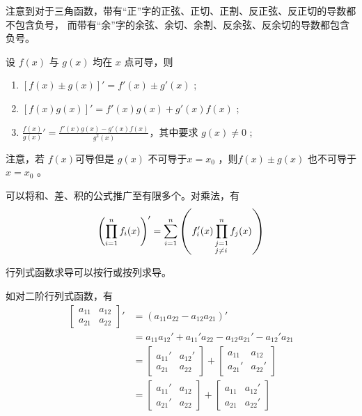 注意到对于三角函数，带有“正”字的正弦、正切、正割、反正弦、反正切的导数都不包含负号，
而带有“余”字的余弦、余切、余割、反余弦、反余切的导数都包含负号。

\begin{Field}[导数的四则运算法则]

    设 $ f(x) $ 与 $ g(x) $ 均在 $ x $ 点可导，则
    \begin{enumerate}
        \item $ \left[f(x)\pm g(x)\right]'=f'(x)\pm g'(x) $ ;
        \item $ \left[f(x)g(x)\right]'=f'(x)g(x)+g'(x)f(x) $ ;
        \item $ \frac{f(x)}{g(x)}'=\frac{f'(x)g(x)-g'(x)f(x)}{g^2(x)}$，其中要求 $ g(x)\neq 0 $  ;
    \end{enumerate}
\end{Field}

注意，若 $ f(x) $可导但是 $ g(x) $ 不可导于$ x=x_0 $ ，则$ f(x)\pm g(x) $ 也不可导于 $ x=x_0 $ 。

可以将和、差、积的公式推广至有限多个。对乘法，有
$$
    \left(\prod_{i=1}^nf_i(x)\right)'=\sum_{i=1}^n\left(f'_i(x)\prod_{\begin{subarray}{align}j=1\\j\neq i\end{subarray}}^n f_j(x)\right)
$$ 

\begin{Field}[行列式函数求导]

    行列式函数求导可以按行或按列求导。
    
    如对二阶行列式函数，有
    \begin{equation*}
        \begin{aligned}
            \left[\begin{matrix}
                a_{11}&a_{12}\\a_{21}&a_{22}
            \end{matrix}\right]'&=(a_{11}a_{22}-a_{12}a_{21})'\\
            &=a_{11}a_{12}'+a_{11}'a_{22}-a_{12}a_{21}'-a_{12}'a_{21}\\ 
            &=\begin{bmatrix}
                a_{11}'&a_{12}'\\a_{21}&a_{22}
            \end{bmatrix}+
            \begin{bmatrix}
                a_{11}&a_{12}\\a_{21}'&a_{22}'
            \end{bmatrix}\\
            &=\begin{bmatrix}
                a_{11}'&a_{12}\\a_{21}'&a_{22}
            \end{bmatrix}+
            \begin{bmatrix}
                a_{11}&a_{12}'\\a_{21}&a_{22}'
            \end{bmatrix}\\
        \end{aligned}
    \end{equation*}
\end{Field}

